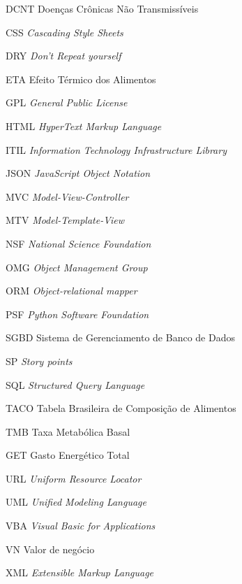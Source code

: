 \documentclass[
	12pt,				%
    oneside,			%
	a4paper,			%
	english,			%
	french,				%
	spanish,			%
	brazil,				%
	]{abntex2}
\begin{document}

\listoffigures* %
\cleardoublepage %




\begin{siglas}
	\item[DCNT] Doenças Crônicas Não Transmissíveis
 	\item[CSS] \textit{Cascading Style Sheets}
	\item[DRY] \textit{Don’t Repeat yourself}
	\item[ETA] Efeito Térmico dos Alimentos
	\item[GPL] \textit{General Public License}
	\item[HTML] \textit{HyperText Markup Language}
	\item[ITIL] \textit{Information Technology Infrastructure Library}
	\item[JSON] \textit{JavaScript Object Notation}
	\item[MVC] \textit{Model-View-Controller}
	\item[MTV] \textit{Model-Template-View}
	\item[NSF] \textit{National Science Foundation}
	\item[OMG] \textit{Object Management Group}
	\item[ORM] \textit{Object-relational mapper}
	\item[PSF] \textit{Python Software Foundation}
	\item[SGBD] Sistema de Gerenciamento de Banco de Dados
	\item[SP] \textit{Story points}
	\item[SQL] \textit{Structured Query Language}
	\item[TACO] Tabela Brasileira de Composição de Alimentos
	\item[TMB] Taxa Metabólica Basal
	\item[GET] Gasto Energético Total
	\item[URL] \textit{Uniform Resource Locator}
	\item[UML] \textit{Unified Modeling Language}
	\item[VBA] \textit{Visual Basic for Applications}
	\item[VN] Valor de negócio
	\item[XML] \textit{Extensible Markup Language}
\end{siglas}
\end{document}
